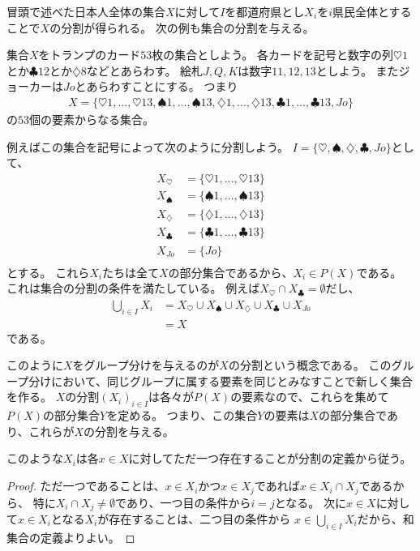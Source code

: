 冒頭で述べた日本人全体の集合$X$に対して$I$を都道府県とし$X_i$を$i$県民全体とすることで$X$の分割が得られる。
次の例も集合の分割を与える。

\begin{eg}
  集合$X$をトランプのカード$53$枚の集合としよう。
  各カードを記号と数字の列$\heartsuit1$とか$\clubsuit12$とか$\diamondsuit8$などとあらわす。
  絵札$J,Q,K$は数字$11, 12, 13$としよう。
  またジョーカーは$Jo$とあらわすことにする。
  つまり
  \begin{align*}
    X=\{\heartsuit1,\ldots,\heartsuit13,\spadesuit1,\ldots,\spadesuit13,\diamondsuit1,\ldots,
    \diamondsuit13,\clubsuit1,\ldots,\clubsuit13,Jo\}
  \end{align*}
  の$53$個の要素からなる集合。

  例えばこの集合を記号によって次のように分割しよう。
  $I=\{\heartsuit,\spadesuit,\diamondsuit,\clubsuit,Jo\}$として、
  \begin{align*}
    X_\heartsuit&=\{\heartsuit1,\ldots,\heartsuit13\}\\
    X_\spadesuit&=\{\spadesuit1,\ldots,\spadesuit13\}\\
    X_\diamondsuit&=\{\diamondsuit1,\ldots,\diamondsuit13\}\\
    X_\clubsuit&=\{\clubsuit1,\ldots,\clubsuit13\}\\
    X_{Jo}&=\{Jo\}\\
  \end{align*}
  とする。
  これら$X_i$たちは全て$X$の部分集合であるから、$X_i\in P(X)$である。
  これは集合の分割の条件を満たしている。
  例えば$X_\heartsuit\cap X_\clubsuit=\emptyset$だし、
  \begin{align*}
    \bigcup_{i\in I}X_i&=
    X_\heartsuit\cup X_\spadesuit\cup X_\diamondsuit\cup X_\clubsuit \cup X_{Jo}\\
    &=X
  \end{align*}
  である。
\end{eg}

このように$X$をグループ分けを与えるのが$X$の分割という概念である。
このグループ分けにおいて、同じグループに属する要素を同じとみなすことで新しく集合を作る。
$X$の分割$(X_i)_{i\in I}$は各々が$P(X)$の要素なので、これらを集めて$P(X)$の部分集合$Y$を定める。
つまり、この集合$Y$の要素は$X$の部分集合であり、これらが$X$の分割を与える。
\begin{dfn}[分割により定まる商集合]
\end{dfn}

このような$X_i$は各$x\in X$に対してただ一つ存在することが分割の定義から従う。
\begin{proof}
ただ一つであることは、$x\in X_i$かつ$x\in X_j$であれば$x\in X_i\cap X_j$であるから、
特に$X_i\cap X_j\neq\emptyset$であり、一つ目の条件から$i=j$となる。
次に$x\in X$に対して$x\in X_i$となる$X_i$が存在することは、二つ目の条件から
$x\in\bigcup_{i\in I}X_i$だから、和集合の定義よりよい。
\end{proof}

